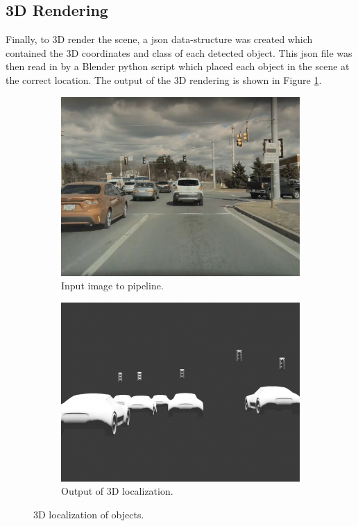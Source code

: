 \subsection{3D Rendering}
Finally, to 3D render the scene, a json data-structure was created which contained the 3D coordinates and class of each detected object. This json file was then read in by a Blender python script which placed each object in the scene at the correct location. The output of the 3D rendering is shown in Figure \ref{fig:3D_localization_output}.
\begin{figure}
    \centering
    \begin{subfigure}{0.95\linewidth}
        \centering
        \includegraphics[width=\textwidth]{images/localization_in.jpg}
        \caption{Input image to pipeline.}
    \end{subfigure}
    \begin{subfigure}{0.95\linewidth}
        \centering
        \includegraphics[width=\textwidth]{images/localization.png}
        \caption{Output of 3D localization.}
    \end{subfigure}
    \caption{3D localization of objects.}
    \label{fig:3D_localization_output}
\end{figure}

